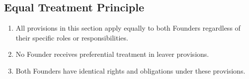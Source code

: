 \subsection{Equal Treatment Principle}
\begin{enumerate}[label=(\alph*)]
\item All provisions in this section apply equally to both Founders regardless of their specific roles or responsibilities.
\item No Founder receives preferential treatment in leaver provisions.
\item Both Founders have identical rights and obligations under these provisions.
\end{enumerate} 